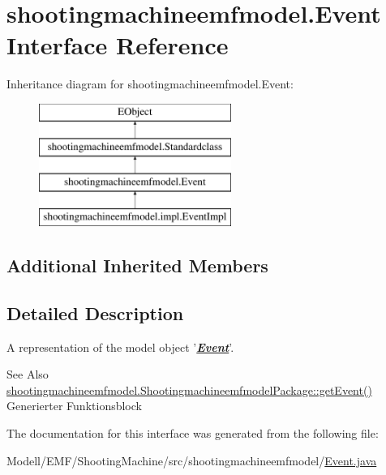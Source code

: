 \hypertarget{interfaceshootingmachineemfmodel_1_1_event}{\section{shootingmachineemfmodel.\-Event Interface Reference}
\label{interfaceshootingmachineemfmodel_1_1_event}
}
Inheritance diagram for shootingmachineemfmodel.\-Event\-:\begin{figure}[H]
\begin{center}
\leavevmode
\includegraphics[height=4.000000cm]{interfaceshootingmachineemfmodel_1_1_event}
\end{center}
\end{figure}
\subsection*{Additional Inherited Members}


\subsection{Detailed Description}
A representation of the model object '{\itshape {\bfseries \hyperlink{interfaceshootingmachineemfmodel_1_1_event}{Event}}}'.

\begin{DoxySeeAlso}{See Also}
\hyperlink{interfaceshootingmachineemfmodel_1_1_shootingmachineemfmodel_package_ac3f35390c2f26e726c768a56d379052c}{shootingmachineemfmodel.\-Shootingmachineemfmodel\-Package\-::get\-Event()}  Generierter Funktionsblock 
\end{DoxySeeAlso}


The documentation for this interface was generated from the following file\-:\begin{DoxyCompactItemize}
\item 
Modell/\-E\-M\-F/\-Shooting\-Machine/src/shootingmachineemfmodel/\hyperlink{_event_8java}{Event.\-java}\end{DoxyCompactItemize}
